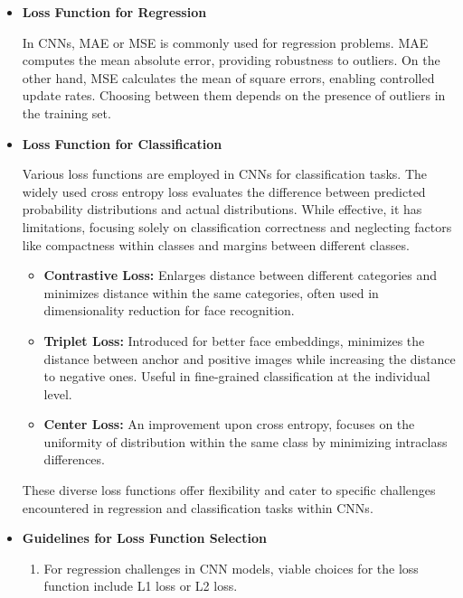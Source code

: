 	\begin{itemize}
		
		\item \textbf{Loss Function for Regression}
	
		In CNNs, MAE or MSE is commonly used for regression problems. MAE computes the mean absolute error, providing robustness to outliers. On the other hand, MSE calculates the mean of square errors, enabling controlled update rates. Choosing between them depends on the presence of outliers in the training set.
		
		\item \textbf{Loss Function for Classification}
		
		Various loss functions are employed in CNNs for classification tasks. The widely used cross entropy loss evaluates the difference between predicted probability distributions and actual distributions. While effective, it has limitations, focusing solely on classification correctness and neglecting factors like compactness within classes and margins between different classes.
		
		\begin{itemize}
			\item \textbf{Contrastive Loss:}
			Enlarges distance between different categories and minimizes distance within the same categories, often used in dimensionality reduction for face recognition.
			
			\item \textbf{Triplet Loss:}
			Introduced for better face embeddings, minimizes the distance between anchor and positive images while increasing the distance to negative ones. Useful in fine-grained classification at the individual level.
			
			\item \textbf{Center Loss:}
			An improvement upon cross entropy, focuses on the uniformity of distribution within the same class by minimizing intraclass differences.
		\end{itemize}
		
		These diverse loss functions offer flexibility and cater to specific challenges encountered in regression and classification tasks within CNNs.
		
		\item \textbf{Guidelines for Loss Function Selection}
		\label{Loss Function}
		\begin{enumerate}
			\item For regression challenges in CNN models, viable choices for the loss function include L1 loss or L2 loss.
			

\end{enumerate}
\end{itemize}
